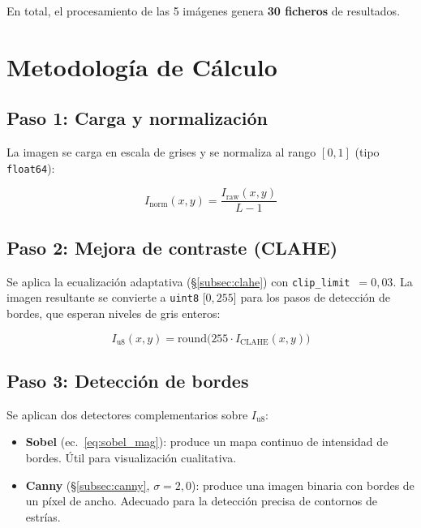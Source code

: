 \documentclass[12pt,a4paper]{article}
\begin{document}
En total, el procesamiento de las 5 imágenes genera \textbf{30 ficheros}
de resultados.

\section{Metodología de Cálculo}
\label{sec:metodologia}

\subsection{Paso 1: Carga y normalización}

La imagen se carga en escala de grises y se normaliza al rango $[0,1]$
(tipo \texttt{float64}):

\begin{equation}
	I_\mathrm{norm}(x,y) = \frac{I_\mathrm{raw}(x,y)}{L - 1}
	\label{eq:normalizacion}
\end{equation}

\subsection{Paso 2: Mejora de contraste (CLAHE)}

Se aplica la ecualización adaptativa (§\ref{subsec:clahe}) con
\texttt{clip\_limit}~$= 0{,}03$.  La imagen resultante se convierte a
\texttt{uint8} [$0,255$] para los pasos de detección de bordes, que
esperan niveles de gris enteros:

\begin{equation}
	I_\mathrm{u8}(x,y) = \mathrm{round}\bigl(255 \cdot I_\mathrm{CLAHE}(x,y)\bigr)
	\label{eq:uint8}
\end{equation}

\subsection{Paso 3: Detección de bordes}

Se aplican dos detectores complementarios sobre $I_\mathrm{u8}$:

\begin{itemize}
	\item \textbf{Sobel} (ec.~\ref{eq:sobel_mag}): produce un mapa
	      continuo de intensidad de bordes.  Útil para visualización
	      cualitativa.
	\item \textbf{Canny} (§\ref{subsec:canny}, $\sigma = 2{,}0$): produce
	      una imagen binaria con bordes de un píxel de ancho.  Adecuado
	      para la detección precisa de contornos de estrías.
\end{itemize}
\end{document}
